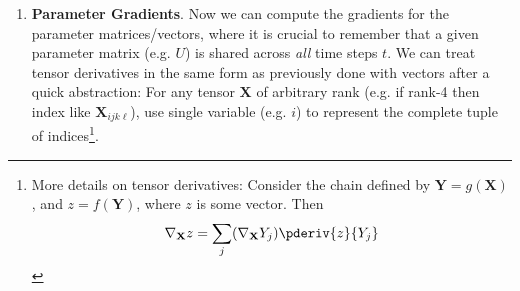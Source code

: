 \documentclass[11pt]{article}
\newcommand\tlab[1]{\tag{#1}\label{#1}}
\begin{document}
\begin{enumerate}
\begin{compactitem}
	\end{compactitem}
	
	\item \textbf{Parameter Gradients}. Now we can compute the gradients for the parameter matrices/vectors, where it is crucial to remember that a given parameter matrix (e.g. $U$) is shared across \textit{all} time steps $t$. We can treat tensor derivatives in the same form as previously done with vectors after a quick abstraction: For any tensor $\mathbf{X}$ of arbitrary rank (e.g. if rank-4 then index like $\mathbf{X}_{ijk\ell}$), use single variable (e.g. $i$) to represent the complete tuple of indices\footnote{More details on tensor derivatives: Consider the chain defined by $\mathbf{Y} = g(\mathbf{X})$, and $z = f(\mathbf{Y})$, where $z$ is some vector. Then $$\nabla_{\mathbf{X}} z = \sum_j (\nabla_{\mathbf{X}} Y_j)\pderiv{z}{Y_j} $$}.
	
\end{enumerate}
\end{document}
